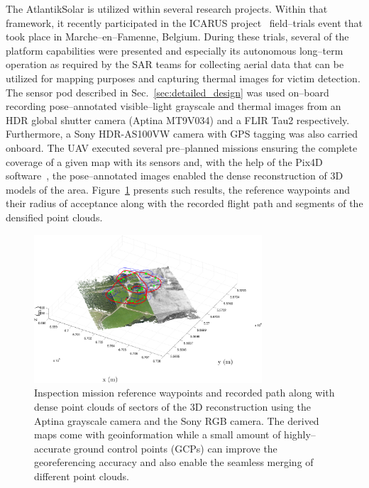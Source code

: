 The AtlantikSolar is utilized within several research projects. Within that framework, it recently participated in the ICARUS project~\cite{ICARUSsite} field--trials event that took place in Marche--en--Famenne, Belgium. During these trials, several of the platform capabilities were presented and especially its autonomous long--term operation as required by the SAR teams for collecting aerial data that can be utilized for mapping purposes and capturing thermal images for victim detection. The sensor pod described in Sec.~\ref{sec:detailed_design} was used on--board recording pose--annotated visible--light grayscale and thermal images from an HDR global shutter camera (Aptina MT9V034) and a FLIR Tau2 respectively. Furthermore, a Sony HDR-AS100VW camera with GPS tagging was also carried onboard. The UAV executed several pre--planned missions ensuring the complete coverage of a given map with its sensors and, with the help of the Pix4D software~\cite{Pix4Dsite}, the pose--annotated images enabled the dense reconstruction of $3\textrm{D}$ models of the area. Figure~\ref{fig:mef_icarus_reconstruction} presents such results, the reference waypoints and their radius of acceptance along with the recorded flight path and segments of the densified point clouds. 


%
\begin{figure}[htbp]
\begin{center}
  \includegraphics*[width=8.5cm]{images/MeF_GS_RGB_Merged_v4.eps} %
\end{center}
\caption{Inspection mission reference waypoints and recorded path along with dense point clouds of sectors of the $3\textrm{D}$ reconstruction using the Aptina grayscale camera and the Sony RGB camera. The derived maps come with geoinformation while a small amount of highly--accurate ground control points (GCPs) can improve the georeferencing accuracy and also enable the seamless merging of different point clouds.  }
\label{fig:mef_icarus_reconstruction}
\end{figure}
%

